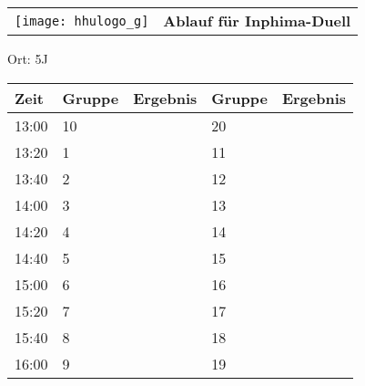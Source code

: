 \documentclass[a4paper,10pt]{article}
\def\spielj{Inphima-Duell}
\def\raumj{5J}
\begin{document}
   \newpage
  \begin{tabularx}{\textwidth}{lc}
    \texttt{[image: hhulogo\_g]}
  & {\Huge \textbf{Ablauf für \spielj}}
  \end{tabularx}
  \LARGE
  \begin{center}
    \vspace{1cm} 
    Ort: \raumj
  \end{center}
    \vspace{2cm} 
    \begin{tabularx}{\textwidth}{X||X|X||X|X}
	\textbf{Zeit} &\textbf{Gruppe} & \textbf{Ergebnis} &\textbf{Gruppe} & \textbf{Ergebnis}  	\\ \hline \hline
	13:00 &	10	&	&20	&	\\ \hline
	13:20 &	1	&	&11	&	\\ \hline
	13:40 &	2	&	&12	&	\\ \hline

	14:00 &	3	&	&13	&	\\ \hline
	14:20 &	4	&	&14	&	\\ \hline
	14:40 &	5	&	&15	&	\\ \hline

	15:00 &	6	&	&16	&	\\ \hline
	15:20 &	7	&	&17	&	\\ \hline
	15:40 &	8	&	&18	&	\\ \hline

	16:00 &	9	&	&19	&	\\ \hline
      
    \end{tabularx}
   
   \newpage
\end{document}

